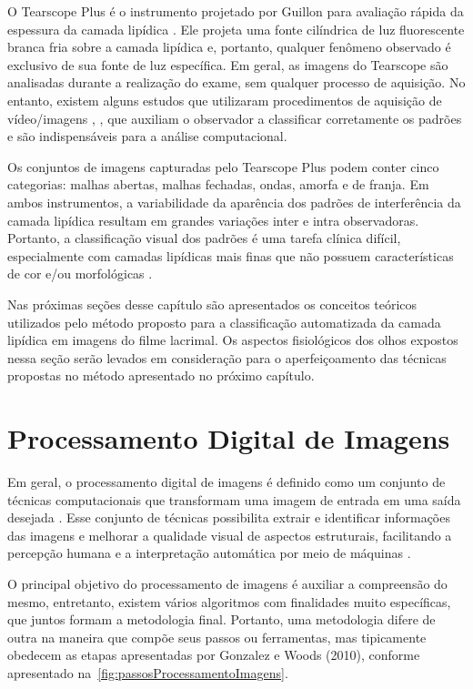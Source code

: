 O Tearscope Plus é o instrumento projetado por Guillon para avaliação rápida da espessura da camada lipídica \cite{GUILLON1998S31}. Ele projeta uma fonte cilíndrica de luz fluorescente branca fria sobre a camada lipídica e, portanto, qualquer fenômeno observado é exclusivo de sua fonte de luz específica. Em geral, as imagens do Tearscope são analisadas durante a realização do exame, sem qualquer processo de aquisição. No entanto, existem alguns estudos que utilizaram procedimentos de aquisição de vídeo/imagens \cite{efron2012}, \cite{king1999three}, que auxiliam o observador a classificar corretamente os padrões e são indispensáveis para a análise computacional.

Os conjuntos de imagens capturadas pelo Tearscope Plus podem conter cinco categorias: malhas abertas, malhas fechadas, ondas, amorfa e de franja. Em ambos instrumentos, a variabilidade da aparência dos padrões de interferência da camada lipídica resultam em grandes variações inter e intra observadoras. Portanto, a classificação visual dos padrões é uma tarefa clínica difícil, especialmente com camadas lipídicas mais finas que não possuem características de cor e/ou morfológicas \cite{garcia2013new}.

Nas próximas seções desse capítulo são apresentados os conceitos teóricos utilizados pelo método proposto para a classificação automatizada da camada lipídica em imagens do filme lacrimal. Os aspectos fisiológicos dos olhos expostos nessa seção serão levados em consideração para o aperfeiçoamento das técnicas propostas no método apresentado no próximo capítulo.

\section{Processamento Digital de Imagens}
\label{sec:PDI}

Em geral, o processamento digital de imagens é definido como um conjunto de técnicas computacionais que transformam uma imagem de entrada em uma saída desejada \cite{gonzalez2010processamento}. Esse conjunto de técnicas possibilita extrair e identificar informações das imagens e melhorar a qualidade visual de aspectos estruturais, facilitando a percepção humana e a interpretação automática por meio de máquinas \cite{pedrini2008analise}.

O principal objetivo do processamento de imagens é auxiliar a compreensão do mesmo, entretanto, existem vários algoritmos com finalidades muito específicas, que juntos formam a metodologia final. Portanto, uma metodologia difere de outra na maneira que compõe seus passos ou ferramentas, mas tipicamente obedecem as etapas apresentadas por Gonzalez e Woods (2010)\nocite{gonzalez2010processamento}, conforme apresentado na~\autoref{fig:passosProcessamentoImagens}.

